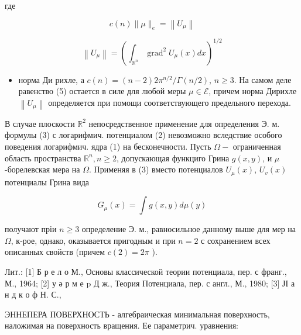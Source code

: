 \documentclass[10pt]{article}
\begin{document}
где



\[

c(n)\|\mu\|_{e}=\left\|U_{\mu}\right\|

\]



\[

\left\|U_{\mu}\right\|=\left(\int_{\mathbb{R}^{n}} \operatorname{grad}^{2} U_{\mu}(x) d x\right)^{1 / 2}

\]



\begin{itemize}

  \item норма Ди рихле, а $c(n)=(n-2) 2 \pi^{n / 2} / \Gamma(n / 2)$, $n \geqslant 3$. На самом деле равенство (5) остается в силе для любой меры $\mu \in \mathcal{E}$, причем норма Дирихле $\left\|U_{\mu}\right\|$ определяется при помощи соответствующего предельного перехода.

\end{itemize}



В случае плоскости $\mathbb{R}^{2}$ непосредственное применение для определения Э. м. формулы (3) с логарифмич. потенциалом (2) невозможно вследствие особого поведения логарифмич. ядра (1) на бесконечности. Пусть $\Omega-$ ограниченная область пространства $\mathbb{R}^{n}, n \geqslant 2$, допускающая функциго Грина $g(x, y)$, и $\mu$-борелевская мера на $\Omega$. Применяя в (3) вместо потенциалов $U_{\mu}(x)$, $U_{v}(x)$ потенциалы Грина вида



\[

G_{\mu}(x)=\int g(x, y) d \mu(y)

\]



получают пріи $n \geqslant 3$ определение Э. м., равносильное данному выше для мер на $\Omega$, к-рое, однако, оказывается пригодным и при $n=2$ с сохранением всех описанных свойств (причем $c(2)=2 \pi$ ).



Лит.: [1] Б р е л о М., Основы классической теории потенциала, пер. с франг., М., 1964; [2] у ә р м е p Д ж., Теория Потенциала, пер. с англ., М., 1980; [3] ЈІ а н д к о ф Н. С.,



ЭННЕПЕРА ПОВЕРХНОСТЬ - алгебраическая минимальная поверхность, наложимая на поверхность вращения. Ее параметрич. уравнения:
\end{document}
